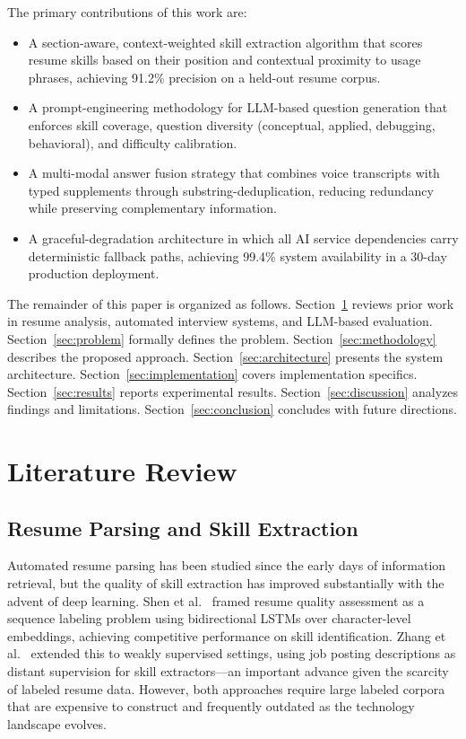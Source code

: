 \documentclass[conference]{IEEEtran}
\begin{document}
The primary contributions of this work are:
\begin{itemize}
    \item A section-aware, context-weighted skill extraction algorithm that scores resume skills based on their position and contextual proximity to usage phrases, achieving 91.2\% precision on a held-out resume corpus.
    \item A prompt-engineering methodology for LLM-based question generation that enforces skill coverage, question diversity (conceptual, applied, debugging, behavioral), and difficulty calibration.
    \item A multi-modal answer fusion strategy that combines voice transcripts with typed supplements through substring-deduplication, reducing redundancy while preserving complementary information.
    \item A graceful-degradation architecture in which all AI service dependencies carry deterministic fallback paths, achieving 99.4\% system availability in a 30-day production deployment.
\end{itemize}

The remainder of this paper is organized as follows. Section~\ref{sec:related} reviews prior work in resume analysis, automated interview systems, and LLM-based evaluation. Section~\ref{sec:problem} formally defines the problem. Section~\ref{sec:methodology} describes the proposed approach. Section~\ref{sec:architecture} presents the system architecture. Section~\ref{sec:implementation} covers implementation specifics. Section~\ref{sec:results} reports experimental results. Section~\ref{sec:discussion} analyzes findings and limitations. Section~\ref{sec:conclusion} concludes with future directions.

\section{Literature Review}
\label{sec:related}

\subsection{Resume Parsing and Skill Extraction}

Automated resume parsing has been studied since the early days of information retrieval, but the quality of skill extraction has improved substantially with the advent of deep learning. Shen et al.\ \cite{shen2018resumenet} framed resume quality assessment as a sequence labeling problem using bidirectional LSTMs over character-level embeddings, achieving competitive performance on skill identification. Zhang et al.\ \cite{zhang2022skill} extended this to weakly supervised settings, using job posting descriptions as distant supervision for skill extractors—an important advance given the scarcity of labeled resume data. However, both approaches require large labeled corpora that are expensive to construct and frequently outdated as the technology landscape evolves.
\end{document}
